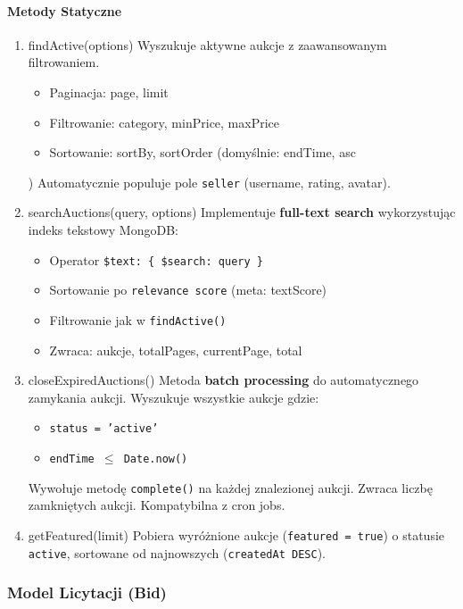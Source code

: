 \paragraph{Metody Statyczne}
\begin{enumerate}
  \item findActive(options)
        Wyszukuje aktywne aukcje z zaawansowanym filtrowaniem.
        \begin{itemize}
          \item Paginacja: page, limit
          \item Filtrowanie: category, minPrice, maxPrice
          \item Sortowanie: sortBy, sortOrder (domyślnie: endTime, asc
        \end{itemize})
        Automatycznie populuje pole \texttt{seller} (username, rating, avatar).
  \item searchAuctions(query, options)
        Implementuje \textbf{full-text search} wykorzystując indeks tekstowy MongoDB:
        \begin{itemize}
          \item Operator \texttt{\$text: \{ \$search: query \}}
          \item Sortowanie po \texttt{relevance score} (meta: textScore)
          \item Filtrowanie jak w \texttt{findActive()}
          \item Zwraca: aukcje, totalPages, currentPage, total
        \end{itemize}
  \item closeExpiredAuctions()
        Metoda \textbf{batch processing} do automatycznego zamykania aukcji. Wyszukuje wszystkie aukcje gdzie:
        \begin{itemize}
          \item \texttt{status = 'active'}
          \item \texttt{endTime $\leq$ Date.now()}
        \end{itemize}
        Wywołuje metodę \texttt{complete()} na każdej znalezionej aukcji. Zwraca liczbę zamkniętych aukcji. Kompatybilna z cron jobs.
  \item getFeatured(limit)
        Pobiera wyróżnione aukcje (\texttt{featured = true}) o statusie \texttt{active}, sortowane od najnowszych (\texttt{createdAt DESC}).
\end{enumerate}

\newpage

\subsubsection{Model Licytacji (Bid)}

